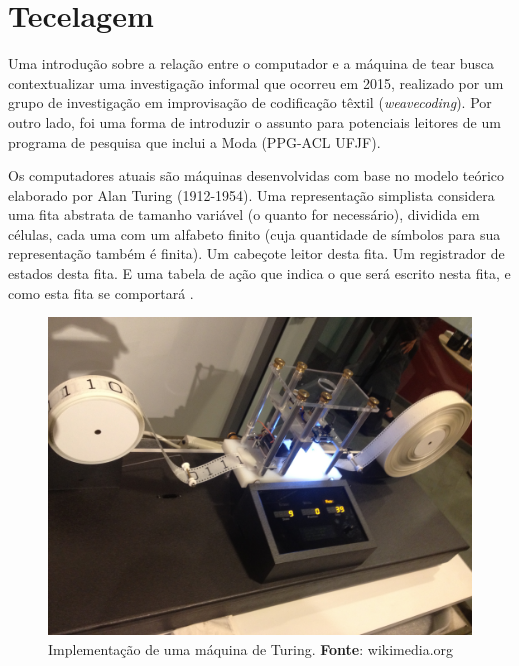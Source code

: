 \section{Tecelagem}\label{sec:tecelagem}

Uma introdução sobre a relação entre o computador e a máquina de tear busca contextualizar uma investigação informal que ocorreu em 2015, realizado por um grupo de investigação em improvisação de codificação têxtil (\emph{weavecoding}). Por outro lado, foi uma forma de introduzir o assunto para potenciais leitores de um programa de pesquisa que inclui a Moda (PPG-ACL UFJF).

Os computadores atuais são máquinas desenvolvidas com base no modelo teórico elaborado por Alan Turing (1912-1954). Uma representação simplista considera uma fita abstrata de tamanho variável (o quanto for necessário), dividida em células, cada uma com um alfabeto finito (cuja quantidade de símbolos para sua representação também é finita). Um cabeçote leitor desta fita. Um registrador de estados desta fita. E uma tabela de ação que indica o que será escrito nesta fita, e como esta fita se comportará .

\begin{figure}[!h]
  \centering
  \includegraphics[scale=0.1]{imagens/turing.jpg}
  \caption{Implementação de uma máquina de Turing. \textbf{Fonte}: wikimedia.org }
  \label{fig:turing}
\end{figure}

